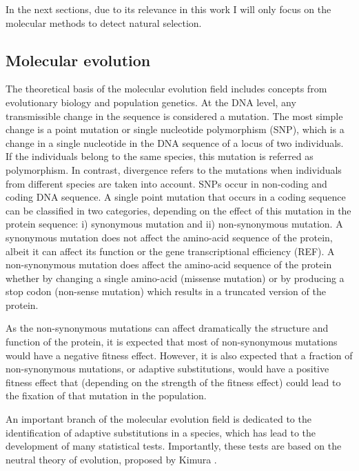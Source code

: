 In the next sections, due to its relevance in this work I will only focus on the molecular methods to detect natural selection.

\subsection{Molecular evolution}

The theoretical basis of the molecular evolution field includes concepts from evolutionary biology and population genetics. At the DNA level, any transmissible change in the sequence is considered a mutation. 
The most simple change is a point mutation or single nucleotide polymorphism (SNP),
which is a change in a single nucleotide in the DNA sequence of a locus of two individuals. 
If the individuals belong to the same species, this mutation is referred as polymorphism. In contrast, divergence refers to the mutations when individuals from different species are taken into account. 
SNPs occur in non-coding and coding DNA sequence. A single point mutation that occurs in a coding sequence can be classified in two categories, depending on the effect of this mutation in the protein sequence: i) synonymous mutation and ii) non-synonymous mutation.
A synonymous mutation does not affect the amino-acid sequence of the protein, albeit it can affect its function 
	\citep{Kimchi-Sarfaty2007}
or the gene transcriptional efficiency (REF).
A non-synonymous mutation does affect the amino-acid sequence of the protein whether by changing a single amino-acid (missense mutation) or by producing a stop codon (non-sense mutation) which results in a truncated version of the protein.

As the non-synonymous mutations can affect dramatically the structure and function of the protein, it is expected that most of non-synonymous mutations would have a negative fitness effect.
However, it is also expected that a fraction of non-synonymous mutations, or adaptive substitutions, would have a positive fitness effect that (depending on the strength of the fitness effect) could lead to the fixation of that mutation in the population.

An important branch of the molecular evolution field is dedicated to the identification of adaptive substitutions in a species, which has lead to the development of many statistical tests. 
Importantly, these tests are based on the neutral theory of evolution, proposed by Kimura
	\citep{Kimura1968}.

